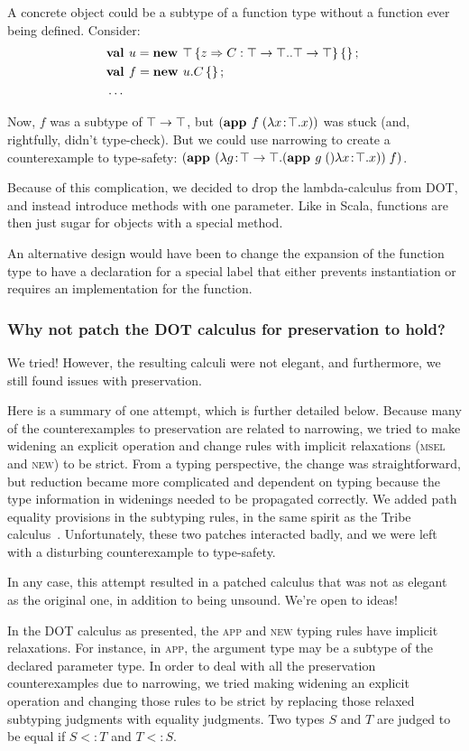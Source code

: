 \documentclass[9pt]{sigplanconf}
\begin{document}
A concrete object could be a subtype of a function type without a
function ever being defined. Consider:
\begin{align*}
&\mlnew u {\Top \refine z {\Ldecl C {\Top \tfun \Top} {\Top \tfun \Top}} \ldefs{}} {
\mlnew f {u.C \ldefs{}} {
\ldots
}}
\end{align*}

Now, $f$ was a subtype of $\top \rightarrow \top$, but $(\textbf{app }f\;(\lambda x\!:\!\top.x))$ was stuck (and, rightfully, didn't type-check). But we could use
narrowing to create a counterexample to type-safety: $(\textbf{app }(\lambda g\!:\!\top \rightarrow \top.(\textbf{app }g\;()\lambda x\!:\!\top.x))\;f)$.

Because of this complication, we decided to drop the lambda-calculus
from DOT, and instead introduce methods with one parameter. Like in
Scala, functions are then just sugar for objects with a special
method.

An alternative design would have been to change the expansion of the
function type to have a declaration for a special label that either
prevents instantiation or requires an implementation for the
function.

\subsubsection{Why not patch the DOT calculus for preservation to hold?}\label{pres-patch}

We tried! However, the resulting calculi were not elegant, and
furthermore, we still found issues with preservation.

Here is a summary of one attempt, which is further detailed
below. Because many of the counterexamples to preservation are related
to narrowing, we tried to make widening an explicit operation and
change rules with implicit relaxations (\textsc{msel} and \textsc{new}) to be
strict. From a typing perspective, the change was straightforward, but
reduction became more complicated and dependent on typing because the
type information in widenings needed to be propagated correctly.  We
added path equality provisions in the subtyping rules, in the same
spirit as the Tribe calculus~\cite{tribe}.  Unfortunately, these two
patches interacted badly, and we were left with a disturbing
counterexample to type-safety.

In any case, this attempt resulted in a patched calculus that was not
as elegant as the original one, in addition to being unsound. We're
open to ideas!

In the DOT calculus as presented, the \textsc{app} and \textsc{new} typing
rules have implicit relaxations. For instance, in \textsc{app}, the
argument type may be a subtype of the declared parameter type. In
order to deal with all the preservation counterexamples due to narrowing, we
tried making widening an explicit operation and changing those rules to be
strict by replacing those relaxed subtyping judgments with equality
judgments. Two types $S$ and $T$ are judged to be equal if $S <: T$
and $T <: S$.
\end{document}
